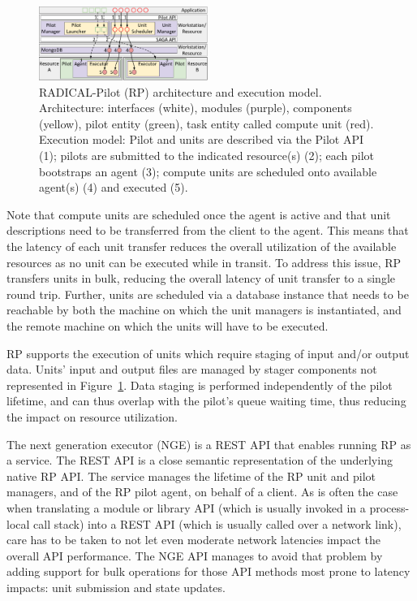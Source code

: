 \documentclass{webofc}
\begin{document}
\begin{figure}
  \centering
  \includegraphics[width=0.49\textwidth]{figures/rp_arch.pdf}
  \caption{RADICAL-Pilot (RP) architecture and execution model.
           Architecture: interfaces (white), modules (purple), components
           (yellow), pilot entity (green), task entity called compute unit
           (red). Execution model: Pilot and units are described via the
           Pilot API (1); pilots are submitted to the indicated resource(s)
           (2); each pilot bootstraps an agent (3); compute units are
           scheduled onto available agent(s) (4) and executed
           (5).}\label{fig:rp-arch}
\end{figure}
	
Note that compute units are scheduled once the agent is active and that unit
descriptions need to be transferred from the client to the agent. This means
that the latency of each unit transfer reduces the overall utilization of the
available resources as no unit can be executed while in transit. To address
this issue, RP transfers units in bulk, reducing the overall latency of unit
transfer to a single round trip. Further, units are scheduled via a database
instance that needs to be reachable by both the machine on which the unit
managers is instantiated, and the remote machine on which the units will have
to be executed.
	
RP supports the execution of units which require staging of input and/or
output data. Units’ input and output files are managed by stager components
not represented in Figure~\ref{fig:rp-arch}. Data staging is performed
independently of the pilot lifetime, and can thus overlap with the pilot's
queue waiting time, thus reducing the impact on resource utilization.
	
The next generation executor (NGE) is a REST API that enables running RP as a
service. The REST API is a close semantic representation of the underlying
native RP API.  The service manages the lifetime of the RP unit and pilot
managers, and of the RP pilot agent, on behalf of a client. As is often the
case when translating a module or library API (which is usually invoked in a
process-local call stack) into a REST API (which is usually called over a
network link), care has to be taken to not let even moderate network
latencies impact the overall API performance.  The NGE API manages to avoid
that problem by adding support for bulk operations for those API methods most
prone to latency impacts: unit submission and state updates.
	
\end{document}
